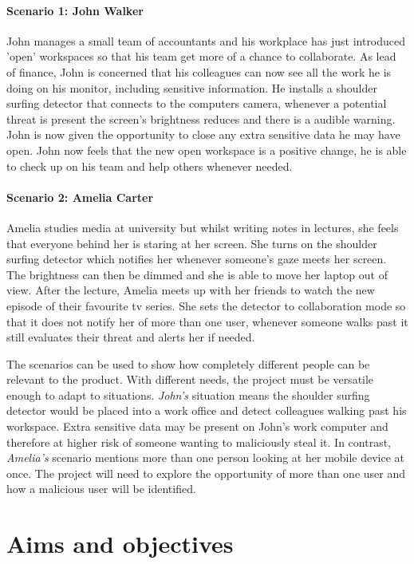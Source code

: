 \documentclass[12pt]{article}
\theoremstyle{plain}
\theoremstyle{definition}
\begin{document}
\paragraph{Scenario 1: John Walker}
John manages a small team of accountants and his workplace has just introduced 'open' workspaces so that his team get more of a chance to collaborate. As lead of finance, John is concerned that his colleagues can now see all the work he is doing on his monitor, including sensitive information. He installs a shoulder surfing detector that connects to the computers camera, whenever a potential threat is present the screen's brightness reduces and there is a audible warning. John is now given the opportunity to close any extra sensitive data he may have open. John now feels that the new open workspace is a positive change, he is able to check up on his team and help others whenever needed.

\paragraph{Scenario 2: Amelia Carter}
Amelia studies media at university but whilst writing notes in lectures, she feels that everyone behind her is staring at her screen. She turns on the shoulder surfing detector which notifies her whenever someone's gaze meets her screen. The brightness can then be dimmed and she is able to move her laptop out of view. After the lecture, Amelia meets up with her friends to watch the new episode of their favourite tv series. She sets the detector to collaboration mode so that it does not notify her of more than one user, whenever someone walks past it still evaluates their threat and alerts her if needed.

The scenarios can be used to show how completely different people can be relevant to the product. With different needs, the project must be versatile enough to adapt to situations. \textit{John's} situation means the shoulder surfing detector would be placed into a work office and detect colleagues walking past his workspace. Extra sensitive data may be present on John's work computer and therefore at higher risk of someone wanting to maliciously steal it. In contrast, \textit{Amelia's} scenario mentions more than one person looking at her mobile device at once. The project will need to explore the opportunity of more than one user and how a malicious user will be identified.

\section{Aims and objectives}
\label{sec:objective} 
\end{document}
